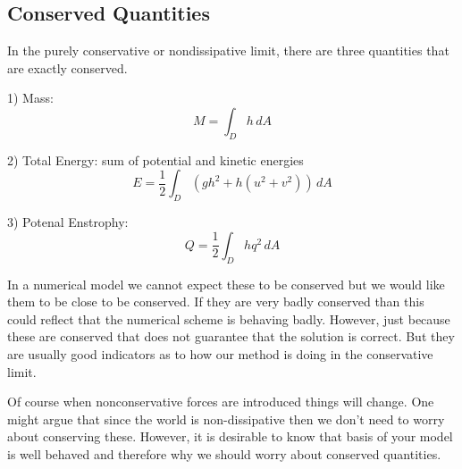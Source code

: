 \documentclass[11pt]{article}
\begin{document}
\subsection*{Conserved Quantities}

In the purely conservative or nondissipative limit, 
there are three quantities that are exactly conserved.  

1) Mass:
$$
M = \int_D h \, dA
$$

2) Total Energy: sum of potential and kinetic energies
$$
E = \frac12 \int_D \left(g h^2 + h( u^2 + v^2)\right) \, dA
$$

3) Potenal Enstrophy: 
$$
Q = \frac12 \int_D  h q^2 \, dA
$$

In a numerical model we cannot expect these to be conserved 
but we would like them to be close to be conserved.  
If they are very badly conserved than this could reflect that
the numerical scheme is behaving badly.
However, just because these are conserved that does not 
guarantee that the solution is correct. 
But they are usually good indicators as to how our method is 
doing in the conservative limit.  

Of course when nonconservative forces are introduced things will change.
One might argue that since the world is non-dissipative then we don't
need to worry about conserving these.  However, it is desirable to
know that basis of your model is well behaved and therefore why
we should worry about conserved quantities.
\end{document}
